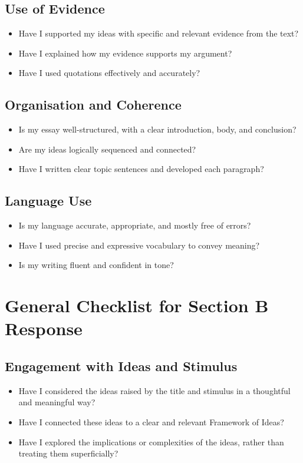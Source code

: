 \documentclass[a4paper]{article}
\begin{document}
\subsection*{Use of Evidence}
\begin{itemize}
  \item Have I supported my ideas with specific and relevant evidence from the text?
  \item Have I explained how my evidence supports my argument?
  \item Have I used quotations effectively and accurately?
\end{itemize}

\subsection*{Organisation and Coherence}
\begin{itemize}
  \item Is my essay well-structured, with a clear introduction, body, and conclusion?
  \item Are my ideas logically sequenced and connected?
  \item Have I written clear topic sentences and developed each paragraph?
\end{itemize}

\subsection*{Language Use}
\begin{itemize}
  \item Is my language accurate, appropriate, and mostly free of errors?
  \item Have I used precise and expressive vocabulary to convey meaning?
  \item Is my writing fluent and confident in tone?
\end{itemize}


\section*{General Checklist for Section B Response}

\subsection*{Engagement with Ideas and Stimulus}
\begin{itemize}
  \item Have I considered the ideas raised by the title and stimulus in a thoughtful and meaningful way?
  \item Have I connected these ideas to a clear and relevant Framework of Ideas?
  \item Have I explored the implications or complexities of the ideas, rather than treating them superficially?
\end{itemize}
\end{document}
